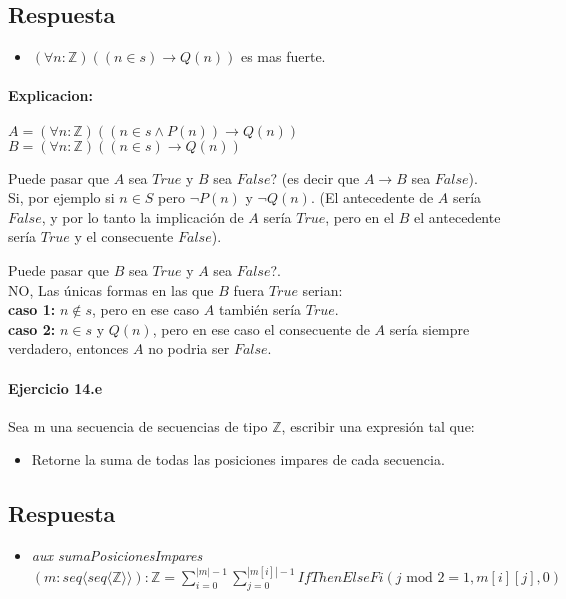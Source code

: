 \documentclass[a4paper]{article}
\begin{document}
\subsection*{Respuesta}

\begin{itemize}
\item $(\forall n: \mathbb{Z})((n \in s)\rightarrow Q(n))$ es mas fuerte.\\
\end{itemize}
\paragraph*{Explicacion:}
\begin{flushleft}
$A= (\forall n:\mathbb{Z})((n \in s \wedge P(n))\rightarrow Q(n))$\\
$B=(\forall n: \mathbb{Z})((n \in s)\rightarrow Q(n))$\\
\end{flushleft} 

Puede pasar que $A$ sea $True$ y $B$ sea $False$? (es decir que $A \rightarrow B$ sea $False$).\smallskip \\ 
Si, por ejemplo si $n \in S$ pero $\neg P(n)$ y $\neg Q(n)$. (El antecedente de $A$ sería $False$, y por lo tanto la implicación de $A$ sería $True$, pero en el $B$ el antecedente sería $True$ y el consecuente $False$).\par \medskip
Puede pasar que $B$ sea $True$ y $A$ sea $False$?.\smallskip \\
NO, Las únicas formas en las que $B$ fuera $True$ serian:\medskip \\
\textbf{caso 1:} $n\not\in s$, pero en ese caso $A$ también sería $True$.\smallskip \\
\textbf{caso 2:} $n\in s$ y $Q(n)$, pero en ese caso el consecuente de $A$ sería siempre verdadero, entonces $A$ no podria ser $False$.




\paragraph{Ejercicio 14.e} Sea m una secuencia de secuencias de tipo $\mathbb{Z}$, escribir una expresión tal que:

\begin{itemize}
	\item Retorne la suma de todas las posiciones impares de cada secuencia.
\end{itemize}

\subsection*{Respuesta}

\begin{itemize}
\item \textit{aux sumaPosicionesImpares}$(m: seq\langle seq\langle \mathbb{Z}\rangle \rangle):\mathbb{Z}
	=\sum_{i=0}^{|m|-1}\sum_{j=0}^{|m[i]|-1} IfThenElseFi(j\textrm{ mod }2=1,m[i][j],0)$
\end{itemize}
\end{document}

